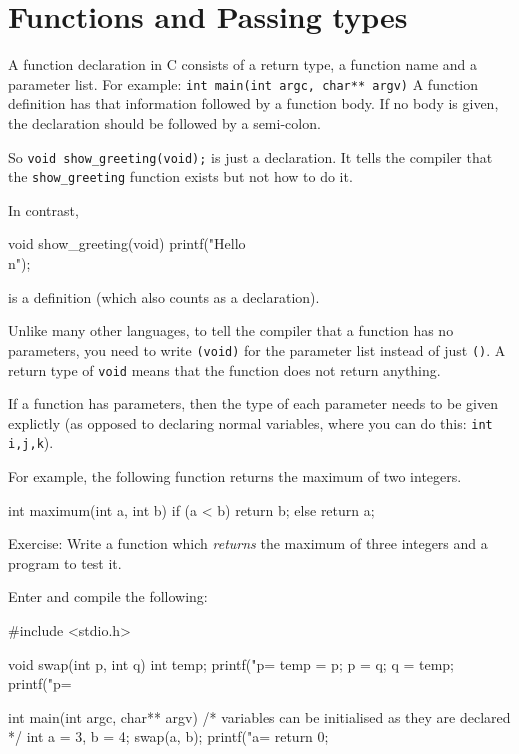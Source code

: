 
\chapter{Functions and Passing types}

A function declaration in C consists of a return type, a function name and a parameter list.
For example:
\lstinline!int main(int argc, char** argv)!
A function definition has that information followed by a function body. 
If no body is given, the declaration should be followed by a semi-colon.

So \lstinline!void show_greeting(void);!  is just a declaration.
It tells the compiler that the \texttt{show\_greeting} function exists but not how to do it.

In contrast,
\begin{codeinline}
void show_greeting(void) {
    printf("Hello\\n");
}
\end{codeinline}

\noindent is a definition (which also counts as a declaration).

Unlike many other languages, to tell the compiler that a function has no parameters, you 
need to write \lstinline!(void)! for the parameter list instead of just \lstinline!()!.
A return type of \lstinline!void! means that the function does not return anything.

If a function has parameters, then the type of each parameter needs to be given explictly (as
opposed to declaring normal variables, where you can do this: \lstinline!int i,j,k!).

For example, the following function returns the maximum of two integers.
\begin{codeblock}
int maximum(int a, int b) {
    if (a < b) {
        return b;
    } else {
        return a;
    }
}
\end{codeblock}

Exercise: Write a function which \emph{returns} the maximum of three integers and a program to test it.

Enter and compile the following:
\begin{codeblock}
#include <stdio.h>

void swap(int p, int q) {
    int temp;
    printf("p=%
    temp = p;
    p = q;
    q = temp;
    printf("p=%
}

int main(int argc, char** argv) {
    /* variables can be initialised as they are declared */
    int a = 3, b = 4;
    swap(a, b);
    printf("a=%
    return 0;
}
\end{codeblock}

